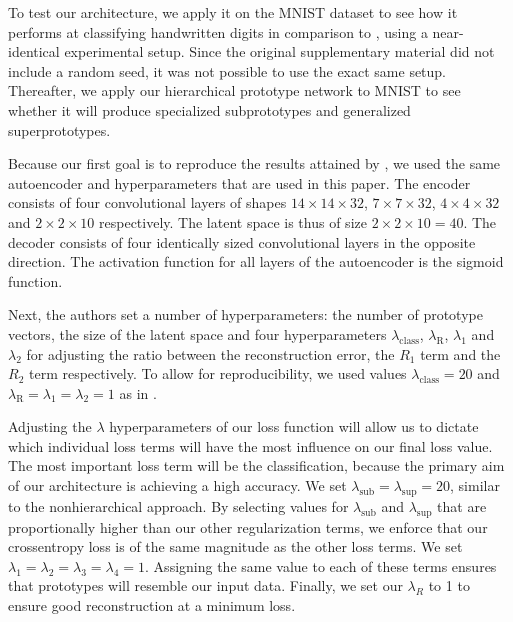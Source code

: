 To test our architecture, we apply it on the MNIST dataset to see how it performs at classifying handwritten digits in comparison to \cite{li2018deep}, using a near-identical experimental setup. Since the original supplementary material did not include a random seed, it was not possible to use the exact same setup. Thereafter, we apply our hierarchical prototype network to MNIST to see whether it will produce specialized subprototypes and generalized superprototypes.

Because our first goal is to reproduce the results attained by \citet{li2018deep}, we used the same autoencoder and hyperparameters that are used in this paper. The encoder consists of four convolutional layers of shapes $14\times 14\times 32$, $7\times 7\times 32$, $4\times 4 \times 32$ and $2\times 2\times 10$ respectively. The latent space is thus of size $2\times 2 \times 10=40$. The decoder consists of four identically sized convolutional layers in the opposite direction. The activation function for all layers of the autoencoder is the sigmoid function. 

Next, the authors set a number of hyperparameters: the number of prototype vectors, the size of the latent space and four hyperparameters $\lambda_{\text{class}}$, $\lambda_{\text{R}}$, $\lambda_1$ and $\lambda_2$ for adjusting the ratio between the reconstruction error, the $R_1$ term and the $R_2$ term respectively. To allow for reproducibility, we used values $\lambda_{\text{class}}=20$ and $\lambda_{\text{R}}=\lambda_1=\lambda_2=1$ as in \cite{li2018deep}.

Adjusting the $\lambda$ hyperparameters of our loss function will allow us to dictate which individual loss terms will have the most influence on our final loss value. The most important loss term will be the classification, because the primary aim of our architecture is achieving a high accuracy. We set $\lambda_{\text{sub}}=\lambda_{\text{sup}}=20$, similar to the nonhierarchical approach. By selecting values for $\lambda_{\text{sub}}$ and $\lambda_{\text{sup}}$ that are proportionally higher than our other regularization terms, we enforce that our crossentropy loss is of the same magnitude as the other loss terms. We set $\lambda_{1}=\lambda_{2}=\lambda_{3}=\lambda_{4}=1$. Assigning the same value to each of these terms ensures that prototypes will resemble our input data. Finally, we set our $\lambda_{R}$ to 1 to ensure good reconstruction at a minimum loss. 

